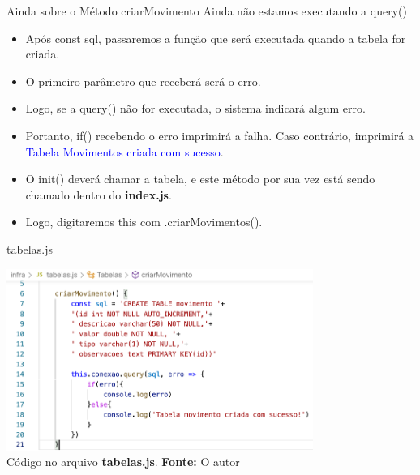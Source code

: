 \documentclass{beamer}
\begin{document}
  \begin{frame}{Ainda sobre o Método criarMovimento}
  Ainda não estamos executando a \alert{query()}
   \begin{itemize}
   \item Após \alert{const sql}, passaremos a função que será executada quando a tabela for criada. 
   \item O primeiro parâmetro que receberá será o erro.
   \item Logo, se a \alert{query()} não for executada, o sistema indicará algum erro. 
   \item Portanto, \alert{if()} recebendo o erro imprimirá a falha. Caso contrário, imprimirá a \textcolor{blue}{Tabela Movimentos criada com sucesso}.
   \item O \alert{init()} deverá chamar a tabela, e este método por sua vez está sendo chamado dentro do \textbf{index.js}. 
   \item Logo, digitaremos this com \alert{.criarMovimentos()}.
   \end{itemize}
  \end{frame}
  
    \begin{frame}{tabelas.js}
         \begin{center}
    	\includegraphics[width=100mm]{resources/aula6_8.png}\\
        \tiny{ Código no arquivo \textbf{tabelas.js}. \textbf{Fonte:} O autor}
     \end{center}   
    \end{frame}
\end{document}
